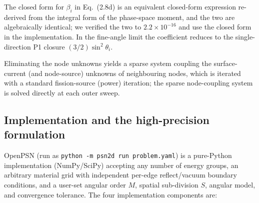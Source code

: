 \documentclass[11pt,a4paper]{article}
\begin{document}
The closed form for $\beta_i$ in Eq.~(2.8d) is an equivalent
closed-form expression re-derived from the integral form of the
phase-space moment, and the two are algebraically identical; we
verified the two to $2.2\times10^{-16}$ and use the closed form in the
implementation. In the fine-angle limit the coefficient reduces to the
single-direction P1 closure
$(3/2)\sin^2\theta_i$.

Eliminating the node unknowns yields a sparse system coupling the
surface-current (and node-source) unknowns of neighbouring nodes, which is
iterated with a standard fission-source (power) iteration; the sparse
node-coupling system is solved directly at each outer sweep.

\subsection{Implementation and the high-precision formulation}

OpenPSN (run as \texttt{python -m psn2d run problem.yaml}) is a
pure-Python implementation (NumPy/SciPy)
accepting any number of energy groups, an arbitrary material grid with
independent per-edge reflect/vacuum boundary conditions, and a user-set
angular order $M$, spatial sub-division $S$, angular model, and
convergence tolerance.
The four implementation components are:
\end{document}
